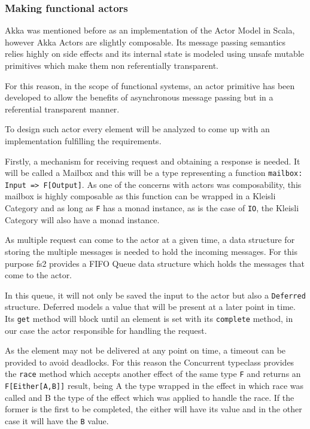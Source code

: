 \documentclass[../main.tex]{subfiles}
\begin{document}
\subsubsection{Making functional actors}
Akka was mentioned before as an implementation of the Actor Model in Scala,
however Akka Actors are slightly composable. Its message passing semantics relies
highly on side effects and its internal state is modeled using unsafe mutable
primitives which make them non referentially transparent.

For this reason, in the scope of functional systems, an actor primitive has been
developed to allow the benefits of asynchronous message passing but in a
referential transparent manner.

To design such actor every element will be analyzed to come up with
an implementation fulfilling the requirements.

Firstly, a mechanism for receiving request and obtaining a
response is needed. It will be called a Mailbox and this will be a type representing a function
\lstinline{mailbox: Input => F[Output]}. As one of the concerns with actors was
composability, this mailbox is highly composable as this function can be wrapped
in a Kleisli Category and as long as \texttt{F} has a monad instance, as is the case of
\texttt{IO}, the Kleisli Category will also have a monad instance.

As multiple request can come to the actor at a given time, a data structure for
storing the multiple messages is needed to hold the incoming messages. For this
purpose fs2 provides a FIFO Queue data structure which holds the messages that
come to the actor.

In this queue, it will not only be saved the input to the actor but also a
\texttt{Deferred} structure. Deferred models a value that will be present at a
later point in time. Its \texttt{get} method will block until an element is set
with its \texttt{complete} method, in our case the actor responsible for
handling the request.

As the element may not be delivered at any point on time,
a timeout can be provided to avoid deadlocks. For this reason the Concurrent
typeclass provides the \texttt{race} method which accepts another effect of the same type
\texttt{F} and returns an \texttt{F[Either[A,B]]} result, being A the type
wrapped in the effect in which race was called and B the type of the effect
which was applied to handle the race. If the former is the first to be completed, the
either will have its value and in the other case it will have the \texttt{B}
value.
\end{document}
